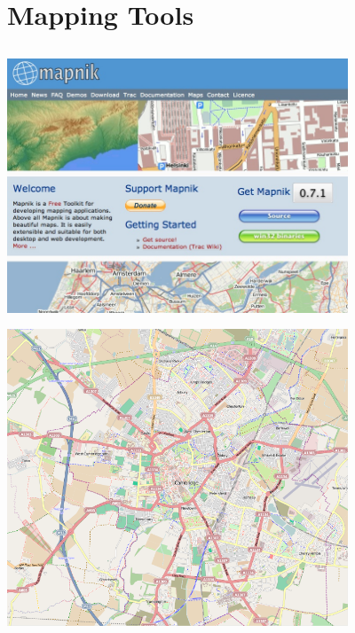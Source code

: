 \section{Mapping Tools}
\subsection{}

\begin{frame}
\begin{center}
\includegraphics[width=4in]{tools/mapnik/mapnik.jpg}
\end{center}
\end{frame}


\begin{frame}
\begin{center}
\includegraphics[width=4in]{tools/mapnik/Cambridge.png}
\end{center}
\end{frame}


